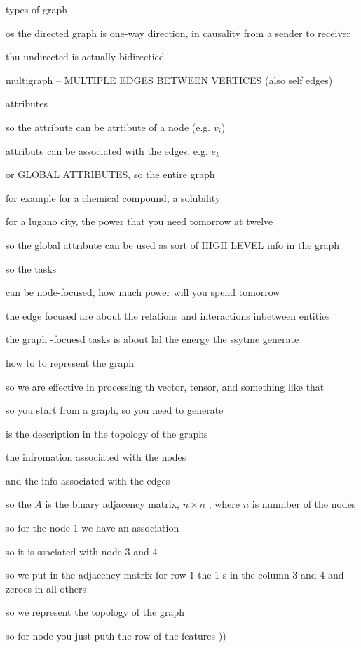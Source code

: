 \documentclass{article}
\begin{document}
types of graph

os the directed graph is one-way direction, in causality from a sender to receiver

thu undirected is actually bidirectied


multigraph -- MULTIPLE EDGES BETWEEN VERTICES  (also self edges)


attributes

so the attribute can be atrtibute of a node (e.g. $v_i$)

attribute can be associated with the edges, e.g. $e_k$


or GLOBAL ATTRIBUTES, so the entire graph

for example for a chemical compound, a solubility 

for a lugano city, the power that you need tomorrow at twelve

so the global attribute can be used as sort of HIGH LEVEL info in the graph




so the tasks 

can be node-focused, how much power  will you spend tomorrow

the edge focused are about the relations and interactions inbetween entities

the graph -focuesd tasks is about lal the energy the ssytme generate



how to to represent the graph

so we are effective in processing th vector, tensor, and something like that

so you start from a graph, so you need to generate

is the description in the topology of the graphs

the infromation associated with the nodes

and the info associated with the edges

so the $A$ is the binary adjacency matrix, $n\times n$ , where $n$ is nunmber of the nodes


so for the node 1 we have an association 

so it is ssociated with node 3 and 4 

so we put in the adjacency matrix for row 1 the 1-s in the column 3 and 4 and zeroes in all others

so we represent the topology of the graph 

so for node you just puth the row of the features ))
\end{document}
